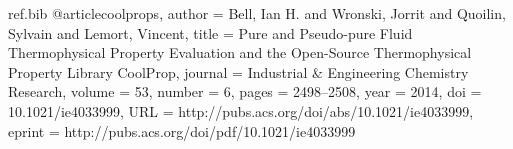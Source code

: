 \begin{filecontents}{ref.bib}
@article{coolprops,
    author = {Bell, Ian H. and Wronski, Jorrit and Quoilin, Sylvain and Lemort, 
Vincent},
    title = {Pure and Pseudo-pure Fluid Thermophysical Property Evaluation and
             the Open-Source Thermophysical Property Library CoolProp},
    journal = {Industrial \& Engineering Chemistry Research},
    volume = {53},
    number = {6},
    pages = {2498--2508},
    year = {2014},
    doi = {10.1021/ie4033999},
    URL = {http://pubs.acs.org/doi/abs/10.1021/ie4033999},
    eprint = {http://pubs.acs.org/doi/pdf/10.1021/ie4033999}
    }
\end{filecontents}


\documentclass{article}
\usepackage[a4paper,margin=0.1in,landscape]{geometry}

\usepackage{amsmath}
\usepackage{pgf}

\usepackage[backend=biber,
style=authoryear,	%
firstinits=true,	%
uniquename=false,	%
uniquelist=false,
maxcitenames=2,		%
maxbibnames=99,		%
natbib=true,		%
hyperref=true,		%
dashed=false		%
ash
]{biblatex}		%





\begin{titlepage}


\begin{figure}[p]
        
\vspace{0cm}
\footnotesize{}
\end{figure}


\end{titlepage}



